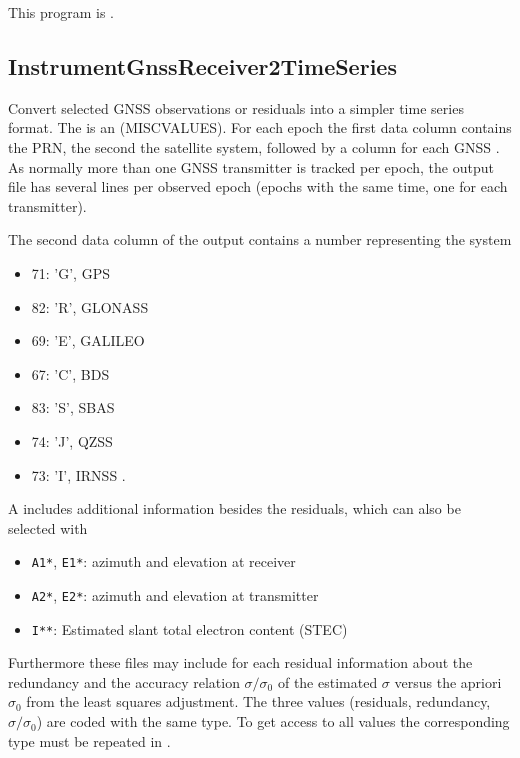 This program is .
\clearpage
\subsection{InstrumentGnssReceiver2TimeSeries}\label{InstrumentGnssReceiver2TimeSeries}
Convert selected GNSS observations or residuals into a simpler time series format.
The  is an  (MISCVALUES).
For each epoch the first data column contains the PRN, the second the satellite system,
followed by a column for each GNSS .
As normally more than one GNSS transmitter is tracked per epoch, the output file
has several lines per observed epoch (epochs with the same time, one for each transmitter).

The second data column of the output contains a number representing the system
\begin{itemize}
\item 71: 'G', GPS
\item 82: 'R', GLONASS
\item 69: 'E', GALILEO
\item 67: 'C', BDS
\item 83: 'S', SBAS
\item 74: 'J', QZSS
\item 73: 'I', IRNSS .
\end{itemize}

A  includes additional information
besides the residuals, which can also be selected with 
\begin{itemize}
\item \verb|A1*|, \verb|E1*|: azimuth and elevation at receiver
\item \verb|A2*|, \verb|E2*|: azimuth and elevation at transmitter
\item \verb|I**|: Estimated slant total electron content (STEC)
\end{itemize}

Furthermore these files may include for each residual 
information about the redundancy and the accuracy relation $\sigma/\sigma_0$
of the estimated $\sigma$ versus the apriori $\sigma_0$ from the least squares adjustment.
The three values (residuals, redundancy, $\sigma/\sigma_0$) are coded with the same type.
To get access to all values the corresponding type must be repeated in .

